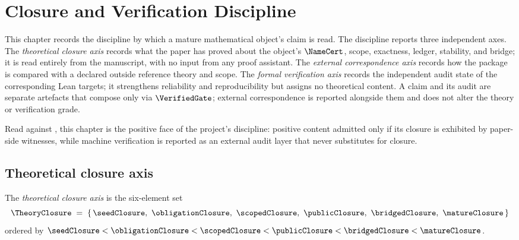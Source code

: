 \chapter{Closure and Verification Discipline}
\label{ch:closure-and-verification-discipline}
\label{ch:acceptance-gate}

This chapter records the discipline by which a mature mathematical object's claim is read. The discipline reports three independent axes. The \emph{theoretical closure axis} records what the paper has proved about the object's $\NameCert$, scope, exactness, ledger, stability, and bridge; it is read entirely from the manuscript, with no input from any proof assistant. The \emph{external correspondence axis} records how the package is compared with a declared outside reference theory and scope. The \emph{formal verification axis} records the independent audit state of the corresponding Lean targets; it strengthens reliability and reproducibility but assigns no theoretical content. A claim and its audit are separate artefacts that compose only via $\VerifiedGate$; external correspondence is reported alongside them and does not alter the theory or verification grade.

Read against , this chapter is the positive face of the project's discipline: positive content admitted only if its closure is exhibited by paper-side witnesses, while machine verification is reported as an external audit layer that never substitutes for closure.

\section{Theoretical closure axis}
\label{sec:closure-axis}

\begin{definition}
\label{def:theory-closure-grades}
The \emph{theoretical closure axis} is the six-element set
$$
  \TheoryClosure \;=\; \{\, \seedClosure,\ \obligationClosure,\ \scopedClosure,\ \publicClosure,\ \bridgedClosure,\ \matureClosure \,\}
$$
ordered by $\seedClosure < \obligationClosure < \scopedClosure < \publicClosure < \bridgedClosure < \matureClosure$.
\end{definition}

